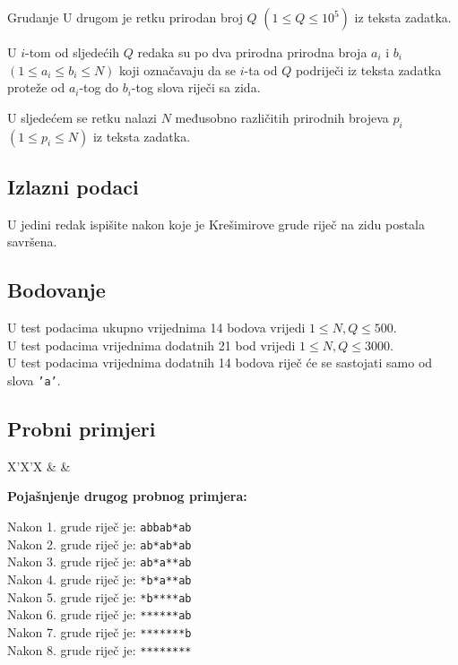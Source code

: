 \begin{statement}[
  problempoints=70,
  timelimit=1 sekunda,
  memorylimit=512 MiB,
]{Grudanje}
U drugom je retku prirodan broj $Q$ $(1 \le Q \le 10^5)$ iz teksta zadatka.

U $i$-tom od sljedećih $Q$ redaka su po dva prirodna prirodna broja $a_i$ i
$b_i$ $(1 \le a_i \le b_i \le N)$ koji označavaju da se $i$-ta od $Q$ podriječi iz
teksta zadatka proteže od $a_i$-tog do $b_i$-tog slova riječi sa zida.

U sljedećem se retku nalazi $N$ međusobno različitih prirodnih brojeva $p_i$
$(1 \le p_i \le N)$ iz teksta zadatka.

\subsection*{Izlazni podaci}
U jedini redak ispišite nakon koje je Krešimirove grude riječ na zidu postala
savršena.

 \subsection*{Bodovanje}
U test podacima ukupno vrijednima 14 bodova vrijedi $1 \le N, Q \le 500$. \\
U test podacima vrijednima dodatnih 21 bod vrijedi $1 \le N, Q \le 3000$. \\
U test podacima vrijednima dodatnih 14 bodova riječ će se sastojati samo od
slova \texttt{'a'}.


\subsection*{Probni primjeri}
\begin{tabularx}{\textwidth}{X'X'X}
 &
 &
\end{tabularx}

\textbf{Pojašnjenje drugog probnog primjera:}

Nakon 1. grude riječ je: \texttt{abbab*ab} \\
Nakon 2. grude riječ je: \texttt{ab*ab*ab} \\
Nakon 3. grude riječ je: \texttt{ab*a**ab} \\
Nakon 4. grude riječ je: \texttt{*b*a**ab} \\
Nakon 5. grude riječ je: \texttt{*b****ab} \\
Nakon 6. grude riječ je: \texttt{******ab} \\
Nakon 7. grude riječ je: \texttt{*******b} \\
Nakon 8. grude riječ je: \texttt{********}

\end{statement}

